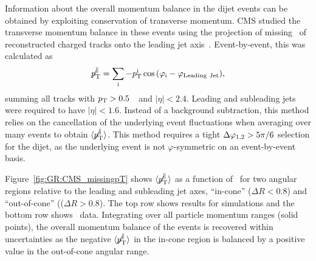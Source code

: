 Information about the overall momentum balance in the dijet events can be obtained by exploiting
conservation of transverse momentum. CMS studied the transverse momentum balance in these events
using the projection of missing \pT\ of reconstructed charged tracks onto the leading 
jet axis~\cite{Chatrchyan:2011sx}. 
Event-by-event, this was calculated as 
\begin{equation}
\displaystyle{\not} p_{\mathrm{T}}^{\parallel} =
\sum_{\rm i}{ -p_{\mathrm{T}}^{\rm i}\cos{(\varphi_{\rm i}-\varphi_{\rm Leading\ Jet})}},
\end{equation}
summing all tracks with $\mbox{$p_{\mathrm{T}}$} > 0.5$~\GeVc\ and $|\eta| < 2.4$.
Leading and subleading jets were required to have $|\eta| < 1.6$.
Instead of a background subtraction, this method relies on the cancellation of the
underlying event fluctuations when averaging over many events to obtain
$\langle \displaystyle{\not} p_{\mathrm{T}}^{\parallel} \rangle$.
This method requires a tight $\Delta\varphi_{1,2} > 5 \pi/6$ selection for the dijet, as the underlying
event is not $\varphi$-symmetric on an event-by-event basis.

Figure~\ref{fig:GR:CMS_missingpT} shows $\langle \displaystyle{\not} p_{\mathrm{T}}^{\parallel} \rangle$
as a function of \AJ\ for two angular regions relative to the leading and subleading
jet axes, ``in-cone'' ($\Delta R < 0.8$) and ``out-of-cone'' (($\Delta R > 0.8$).
The top row shows results for  {} simulations and the bottom row shows
\PbPb\ data. Integrating over all particle momentum ranges (solid points),
 the overall momentum balance of the events is recovered within uncertainties
as the negative $\langle \displaystyle{\not} p_{\mathrm{T}}^{\parallel} \rangle$ in
the in-cone region is balanced by a positive value in the out-of-cone angular range.

